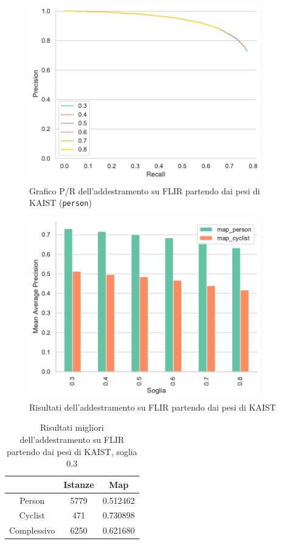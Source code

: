 \begin{figure}[]
    \centering
    \includegraphics[width=0.9\textwidth]{images/graphic/flir_from_kaist_pr.pdf}
    \caption{Grafico P/R dell'addestramento su FLIR partendo dai pesi di KAIST (\texttt{person})}
    \label{fig:flir_train_from_kaist_pr}
\end{figure}
\begin{figure}[]
    \centering
    \includegraphics[width=0.9\textwidth]{images/graphic/flir_from_kaist_result.pdf}
    \caption{Risultati dell'addestramento su FLIR partendo dai pesi di KAIST}
    \label{fig:flir_train_from_kaist_result}
\end{figure}
\begin{table}[]
    \centering
    \begin{tabular}{c|c|c|}
    \cline{2-3}
     & Istanze & Map \\ \hline
    \multicolumn{1}{|c|}{Person} & 5779 & 0.512462 \\ \hline
    \multicolumn{1}{|c|}{Cyclist} & 471 & 0.730898 \\ \hline
    \multicolumn{1}{|c|}{Complessivo} & 6250 & 0.621680 \\ \hline
    \end{tabular}
    \caption{Risultati migliori dell'addestramento su FLIR partendo dai pesi di KAIST, soglia $0.3$}
    \label{table:best_flir_from_kaist}
\end{table}


